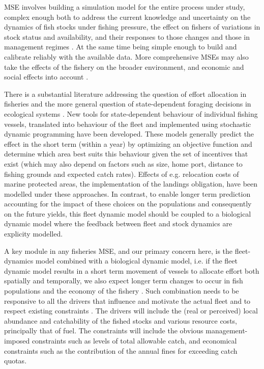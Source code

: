 \documentclass[12pt,oneline,a4paper,numbib]{ouparticle}
\begin{document}
MSE involves building a simulation model for the entire process under study, complex enough both to address the current knowledge and uncertainty on the dynamics of fish stocks under fishing pressure, the effect on fishers of variations in stock status and availability, and their responses to those changes and those in management regimes \cite{Venables2009}. At the same time being simple enough to build and calibrate reliably with the available data. More comprehensive MSEs may also take the effects of the fishery on the broader environment, and economic and social effects into account \cite{Dichmont2008, Fulton2007}. 

There is a substantial literature addressing the question of effort allocation in fisheries and the more general question of state-dependent foraging decisions in ecological systems \cite{ClarkandMangel2000,Houston1999}. New tools for state-dependent behaviour of individual fishing vessels, translated into behaviour of the fleet and implemented using stochastic dynamic programming \cite{Alzorriz2017,Batsleer2015, Dowling2011, Poos2010} have been developed. These models generally predict the effect in the short term (within a year) by optimizing an objective function and determine which area best suits this behaviour given the set of incentives that exist (which may also depend on factors such as size, home port, distance to fishing grounds and expected catch rates). Effects of e.g. relocation costs of marine protected areas, the implementation of the landings obligation, have been modelled under these approaches. In contrast, to enable longer term prediction accounting for the impact of these choices on the populations and consequently on the future yields, this fleet dynamic model should be coupled to a biological dynamic model where the feedback between fleet and stock dynamics are explicity modelled.
 
A key module in any fisheries MSE, and our primary concern here, is the fleet-dynamics model combined with a biological dynamic model, i.e. if the fleet dynamic model results in a short term movement of vessels to allocate effort both spatially and temporally, we also expect longer term changes to occur in fish populations and the economy of the fishery \cite{Alzorriz2017}. Such combination needs to be responsive to all the drivers that influence and motivate the actual fleet and to respect existing constraints \cite{Venables2009}. The drivers will include the (real or perceived) local abundance and catchability of the fished stocks and various resource costs, principally that of fuel. The constraints will include the obvious management-imposed constraints such as levels of total allowable catch, and economical constraints such as the contribution of the annual fines for exceeding catch quotas.
\end{document}
